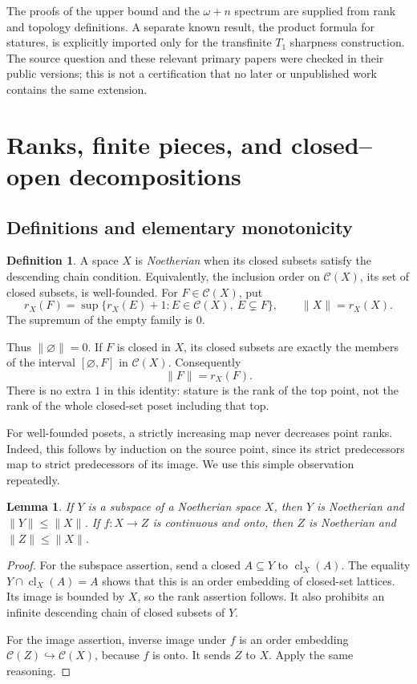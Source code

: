 \documentclass[11pt,a4paper]{article}
\newtheorem{lemma}[lemma]{Lemma}
\theoremstyle{definition}
\newtheorem{definition}[definition]{Definition}
\newcommand{\Cl}{\mathcal C}
\newcommand{\st}[1]{\lVert #1\rVert}
\newcommand{\cl}{\operatorname{cl}}
\numberwithin{equation}{section}
\begin{document}
The proofs of the upper bound and the $\omega+n$ spectrum are supplied
from rank and topology definitions.  A separate known result, the product
formula for statures, is explicitly imported only for the transfinite
$T_1$ sharpness construction.  The source question and these relevant
primary papers were checked in their public versions; this is not a
certification that no later or unpublished work contains the same
extension.

\section{Ranks, finite pieces, and closed--open decompositions}
\label{sec:rank}

\subsection{Definitions and elementary monotonicity}

\begin{definition}
A space $X$ is \emph{Noetherian} when its closed subsets satisfy the
descending chain condition.  Equivalently, the inclusion order on
$\Cl(X)$, its set of closed subsets, is well-founded.  For $F\in\Cl(X)$,
put
\[
 r_X(F)=\sup\{r_X(E)+1:E\in\Cl(X),\ E\subsetneq F\},
 \qquad \st X=r_X(X).
\]
The supremum of the empty family is $0$.
\end{definition}

Thus $\st\varnothing=0$.  If $F$ is closed in $X$, its closed subsets are
exactly the members of the interval $[\varnothing,F]$ in $\Cl(X)$.
Consequently
\begin{equation}\label{eq:closedrank}
 \st F=r_X(F).
\end{equation}
There is no extra $1$ in this identity: stature is the rank of the top
point, not the rank of the whole closed-set poset including that top.

For well-founded posets, a strictly increasing map never decreases point
ranks.  Indeed, this follows by induction on the source point, since its
strict predecessors map to strict predecessors of its image.  We use
this simple observation repeatedly.

\begin{lemma}\label{lem:monotone}
If $Y$ is a subspace of a Noetherian space $X$, then $Y$ is Noetherian and
$\st Y\leq\st X$.  If $f:X\to Z$ is continuous and onto, then $Z$ is
Noetherian and $\st Z\leq\st X$.
\end{lemma}
\begin{proof}
For the subspace assertion, send a closed $A\subseteq Y$ to
$\cl_X(A)$.  The equality $Y\cap\cl_X(A)=A$ shows that this is an order
embedding of closed-set lattices.  Its image is bounded by $X$, so the
rank assertion follows.  It also prohibits an infinite descending chain
of closed subsets of $Y$.

For the image assertion, inverse image under $f$ is an order embedding
$\Cl(Z)\hookrightarrow\Cl(X)$, because $f$ is onto.  It sends $Z$ to $X$.
Apply the same reasoning.
\end{proof}
\end{document}
